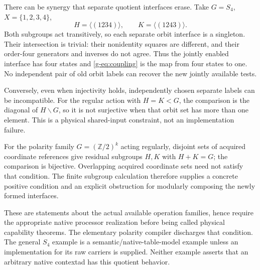 \documentclass[11pt]{article}
\theoremstyle{definition}
\theoremstyle{remark}
\begin{document}
There can be synergy that separate quotient interfaces erase. Take $G=S_4$, $X=\{1,2,3,4\}$,
\[
 H=\langle(1234)\rangle,\qquad K=\langle(1243)\rangle.
\]
Both subgroups act transitively, so each separate orbit interface is a singleton. Their intersection is trivial: their nonidentity squares are different, and their order-four generators and inverses do not agree. Thus the jointly enabled interface has four states and \eqref{g-eq:coupling} is the map from four states to one. No independent pair of old orbit labels can recover the new jointly available tests.

Conversely, even when injectivity holds, independently chosen separate labels can be incompatible. For the regular action with $H=K<G$, the comparison is the diagonal of $H\backslash G$, so it is not surjective when that orbit set has more than one element. This is a physical shared-input constraint, not an implementation failure.

For the polarity family $G=(\mathbb Z/2)^k$ acting regularly, disjoint sets of acquired coordinate references give residual subgroups $H,K$ with $H+K=G$; the comparison is bijective. Overlapping acquired coordinate sets need not satisfy that condition. The finite subgroup calculation therefore supplies a concrete positive condition and an explicit obstruction for modularly composing the newly formed interfaces.

These are statements about the actual available operation families, hence require the appropriate native processor realization before being called physical capability theorems. The elementary polarity compiler discharges that condition. The general $S_4$ example is a semantic/native-table-model example unless an implementation for its raw carriers is supplied. Neither example asserts that an arbitrary native contextad has this quotient behavior.
\end{document}
